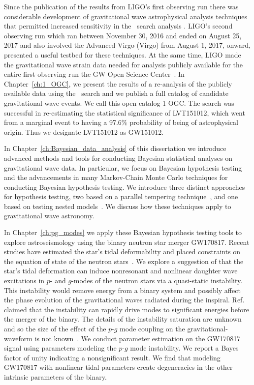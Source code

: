 Since the publication of the results from LIGO's first observing run there was considerable development of gravitational wave astrophysical analysis techniques that permitted increased sensitivity in the \pycbc{}\ search analysis \citep{Nitz:2017svb,Nitz:2017lco,DalCanton:2017ala}. LIGO's second observing run which ran between November 30, 2016 and ended on August 25, 2017 and also involved the Advanced Virgo (Virgo) from August 1, 2017, onward, presented a useful testbed for these techniques. At the same time, LIGO made the gravitational wave strain data needed for analysis publicly available for the entire first-observing run the GW Open Science Center~\citep{Vallisneri:2014vxa}. In Chapter~\ref{ch:1_OGC}, we present the results of a re-analysis of the publicly available data using the \pycbc{}\ search and we publish a full catalog of candidate gravitational wave events. We call this open catalog 1-OGC. The search was successful in re-estimating the statistical significance of LVT151012, which went from a marginal event to having a 97.6$\%$ probability of being of astrophysical origin. Thus we designate LVT151012 as GW151012. 


In Chapter~\ref{ch:Bayesian_data_analysis} of this dissertation we introduce advanced methods and tools for conducting Bayesian statistical analyses on gravitational wave data. In particular, we focus on Bayesian hypothesis testing and the advancements in many Markov-Chain Monte Carlo techniques for conducting Bayesian hypothesis testing. We introduce three distinct approaches for hypothesis testing, two based on a parallel tempering technique~\cite{lartillot2006computing,friel2008marginal,xie2010improving}, and one based on testing nested models~\cite{edwards1963bayesian, dickey1971weighted}. We discuss how these techniques apply to gravitational wave astronomy. 

In Chapter~\ref{ch:pg_modes} we apply these Bayesian hypothesis testing tools to explore astroseismology using the binary neutron star merger GW170817. Recent studies have estimated the star's tidal deformability and placed constraints on the equation of state of the neutron stars~\citep{TheLIGOScientific:2017qsa,Tews:2018iwm,Most:2018eaw,Raithel:2018ncd,de2018tidal,Abbott:2018exr,Abbott:2018wiz,Radice:2018ozg,LIGOScientific:2019eut,Capano:2019eae}. We explore a suggestion of \cite{Weinberg:2013pbi} that the star's tidal deformation can induce nonresonant and nonlinear daughter wave excitations in $p$- and $g$-modes of the neutron stars via a quasi-static instability. This instability would remove energy from a binary system and possibly affect the phase evolution of the gravitational waves radiated during the inspiral. Ref. \cite{Weinberg:2015pxa} claimed that the instability can rapidly drive modes to significant energies before the merger of the binary. The details of the instability saturation are unknown and so the size of the effect of the $p$-$g$ mode coupling on the gravitational-waveform is not known~\citep{Weinberg:2015pxa}. We conduct parameter estimation on the GW170817 signal using parameters modeling the $p$-$g$ mode instability. We report a Bayes factor of unity indicating a nonsignificant result. We find that modeling GW170817 with nonlinear tidal parameters create degeneracies in the other intrinsic parameters of the binary.
